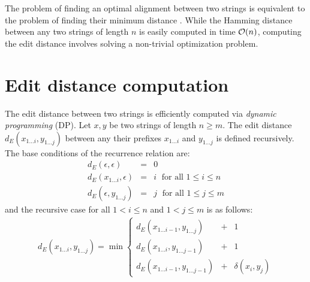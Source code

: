 The problem of finding an optimal alignment between two strings is equivalent to the problem of finding their minimum distance \citep{Gusfield1997}.
While the Hamming distance between any two strings of length $n$ is easily computed in time $\mathcal{O}(n)$, computing the edit distance involves solving a non-trivial optimization problem.

\section{Edit distance computation}

The edit distance between two strings is efficiently computed via \emph{dynamic programming} (DP).
Let $x,y$ be two strings of length $n \geq m$.
The edit distance $d_E(x_{1 \dots i},y_{1 \dots j})$ between any their prefixes $x_{1 \dots i}$ and $y_{1 \dots j}$ is defined recursively.
The base conditions of the recurrence relation are:
\begin{eqnarray}
d_E(\epsilon,\epsilon)&=&0\label{eq:dp-ee}\\
d_E(x_{1 \dots i},\epsilon)&=&i \; \text{ for all } 1 \leq i \leq n\label{eq:dp-row}\\
d_E(\epsilon, y_{1 \dots j})&=&j \; \text{ for all } 1 \leq j \leq m\label{eq:dp-col}
\end{eqnarray}
and the recursive case for all $1 < i \leq n$ and $1 < j \leq m$ is as follows:
\begin{eqnarray}
d_E(x_{1\dots i},y_{1 \dots j}) = \min \left\{
\begin{array}{lcl}
d_E(x_{1 \dots i-1},y_{1 \dots j})&+&1\\
d_E(x_{1 \dots i},y_{1 \dots j-1})&+&1\\
d_E(x_{1 \dots i-1},y_{1 \dots j-1})&+&\delta(x_i, y_j)
\end{array}
\right.\label{eq:dp-min}
\end{eqnarray}

